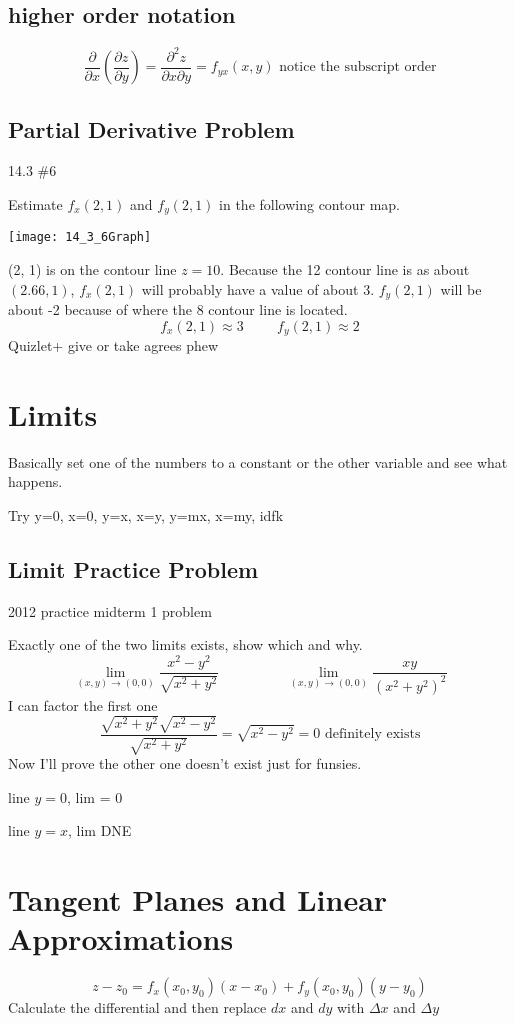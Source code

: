 \documentclass{report}
\newcommand{\pdif}[2]{ \frac{\partial #1}{ \partial #2} }
\newcommand{\pderiv}[1]{ \frac{\partial}{ \partial #1} }
\begin{document}
\subsection{higher order notation}
$$
\pderiv{x} \left( \pdif{z}{y} \right) = \frac{\partial^2z}{\partial x \partial y} = f_{yx}(x, y)
\text{ notice the subscript order}
$$

\newpage
\subsection{Partial Derivative Problem}
14.3 \#6

Estimate $f_x(2, 1)$ and $f_y(2, 1)$ in the following contour map.
\newline

\texttt{[image: 14\_3\_6Graph]}
\newline

(2, 1) is on the contour line $z = 10$. Because the 12 contour line is as about $(2.66, 1)$, $f_x(2, 1)$ will probably have a value of about 3. $f_y(2, 1)$ will be about -2 because of where the 8 contour line is located.
$$
f_x(2, 1) \approx 3 \hspace{1cm} f_y(2, 1) \approx 2
$$
Quizlet+ give or take agrees phew

\section{Limits}
Basically set one of the numbers to a constant or the other variable and see what happens.

Try y=0, x=0, y=x, x=y, y=mx, x=my, idfk

\subsection{Limit Practice Problem}
2012 practice midterm 1 problem

Exactly one of the two limits exists, show which and why.
$$
\lim_{(x, y) \to (0, 0)} \frac{x^2 - y^2}{\sqrt{x^2 + y^2}}
\hspace{2cm}
\lim_{(x, y) \to (0, 0)} \frac{xy}{(x^2 + y^2)^2	}
$$
I can factor the first one
$$
\frac{\sqrt{x^2 + y^2} \sqrt{x^2 - y^2}}{\sqrt{x^2+y^2}} = \sqrt{x^2 - y^2} = 0 \text{ definitely exists}
$$
Now I'll prove the other one doesn't exist just for funsies.

line $y=0$, lim = 0

line $y=x$, lim DNE


\section{Tangent Planes and Linear Approximations}
$$
z - z_0 = f_x(x_0, y_0) (x - x_0) + f_y(x_0, y_0) (y - y_0)
$$
Calculate the differential and then replace $dx$ and $dy$ with $\Delta x$ and $\Delta y$
\end{document}
